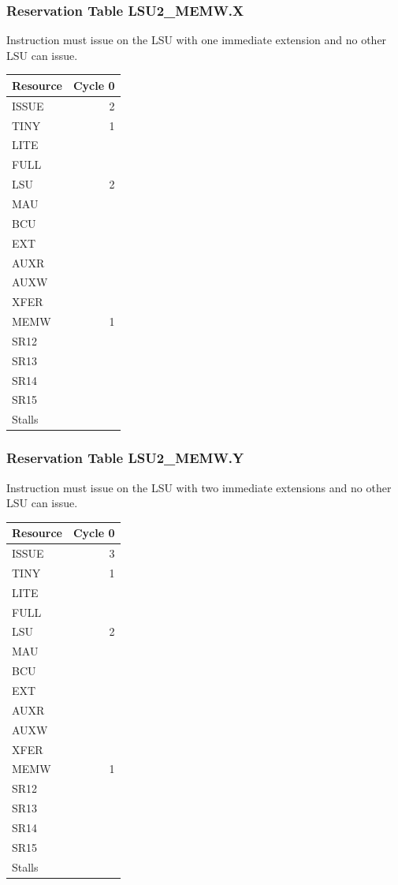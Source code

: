 \subsubsection{Reservation Table LSU2\_MEMW.X} \label{sec:reservation-LSU2-MEMW.X}

Instruction must issue on the LSU with one immediate extension and no other LSU can issue.
\medskip

\begin{tabular}{|l|r|} \hline
Resource	& Cycle 0 \\ \hline
\textsf{ISSUE}	& 2	\\
\textsf{TINY}	& 1	\\
\textsf{LITE}	& 	\\
\textsf{FULL}	& 	\\
\textsf{LSU}	& 2	\\
\textsf{MAU}	& 	\\
\textsf{BCU}	& 	\\
\textsf{EXT}	& 	\\
\textsf{AUXR}	& 	\\
\textsf{AUXW}	& 	\\
\textsf{XFER}	& 	\\
\textsf{MEMW}	& 1	\\
\textsf{SR12}	& 	\\
\textsf{SR13}	& 	\\
\textsf{SR14}	& 	\\
\textsf{SR15}	& 	\\
\hline Stalls	& 	\\
\hline \end{tabular}

\subsubsection{Reservation Table LSU2\_MEMW.Y} \label{sec:reservation-LSU2-MEMW.Y}

Instruction must issue on the LSU with two immediate extensions and no other LSU can issue.
\medskip

\begin{tabular}{|l|r|} \hline
Resource	& Cycle 0 \\ \hline
\textsf{ISSUE}	& 3	\\
\textsf{TINY}	& 1	\\
\textsf{LITE}	& 	\\
\textsf{FULL}	& 	\\
\textsf{LSU}	& 2	\\
\textsf{MAU}	& 	\\
\textsf{BCU}	& 	\\
\textsf{EXT}	& 	\\
\textsf{AUXR}	& 	\\
\textsf{AUXW}	& 	\\
\textsf{XFER}	& 	\\
\textsf{MEMW}	& 1	\\
\textsf{SR12}	& 	\\
\textsf{SR13}	& 	\\
\textsf{SR14}	& 	\\
\textsf{SR15}	& 	\\
\hline Stalls	& 	\\
\hline \end{tabular}

